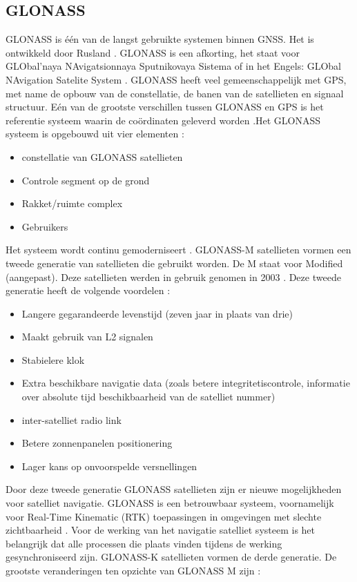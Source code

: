\subsection{GLONASS}
\label{LGLO}
GLONASS is \'e\'en van de langst gebruikte systemen binnen GNSS. Het is ontwikkeld door Rusland \cite{LBibGLONASS2}. GLONASS is een afkorting, het staat voor GLObal'naya NAvigatsionnaya Sputnikovaya Sistema of in het Engels: GLObal NAvigation Satelite System  \cite{LBibBeiDou,LBibGNSS8}. GLONASS heeft veel gemeenschappelijk met GPS, met name de opbouw van de constellatie, de banen van de satellieten en signaal structuur. E\'en van de grootste verschillen tussen GLONASS en GPS is het referentie systeem waarin de co\"ordinaten geleverd worden \cite{LBibGNSS8}.Het GLONASS systeem is opgebouwd uit vier elementen \cite{LBibGLONASS2}:
\begin{itemize}
	\item constellatie van GLONASS satellieten
	\item Controle segment op de grond
	\item Rakket/ruimte complex
	\item Gebruikers
\end{itemize} 
Het systeem wordt continu gemoderniseert \cite{LBibGNSS4}. GLONASS-M satellieten vormen een tweede generatie van satellieten die gebruikt worden\cite{LBibGNSS}. De M staat voor Modified (aangepast). Deze satellieten werden in gebruik genomen in 2003 \cite{LBibPPP}. Deze tweede generatie heeft de volgende voordelen \cite{LBibGLONASS,LBibPPP}:
\begin{itemize}
	\item Langere gegarandeerde levenstijd (zeven jaar in plaats van drie)
	\item Maakt gebruik van L2 signalen
	\item Stabielere klok
	\item Extra beschikbare navigatie data (zoals betere integritetiscontrole, informatie over absolute tijd beschikbaarheid van de satelliet nummer)
	\item inter-satelliet radio link
	\item Betere zonnenpanelen positionering
	\item Lager kans op onvoorspelde versnellingen
\end{itemize}
Door deze tweede generatie GLONASS satellieten zijn er nieuwe mogelijkheden voor satelliet navigatie. GLONASS is een betrouwbaar systeem, voornamelijk voor Real-Time Kinematic (RTK) toepassingen in omgevingen met slechte zichtbaarheid \cite{LBibGLONASS}. Voor de werking van het navigatie satelliet systeem is het belangrijk dat alle processen die plaats vinden tijdens de werking gesynchroniseerd zijn. GLONASS-K satellieten vormen de derde generatie. De grootste veranderingen ten opzichte van GLONASS M zijn \cite{LBibGLONASS2}:
